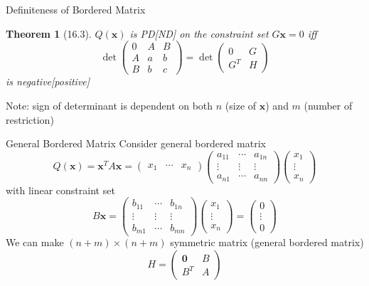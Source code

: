 \documentclass[final]{beamer}
\newtheorem{thm}{Theorem}
\newcommand{\bd}{\mathbf}
\begin{document}
\begin{frame}[t]{Definiteness of Bordered Matrix}
	\begin{thm}
		[16.3] $Q(\bd{x})$ is PD[ND] on the constraint set $G\bd{x}=0$ iff\[
			\det \begin{pmatrix}
							0&A&B\\
							A&a&b\\
							B&b&c
						\end{pmatrix}=\det \begin{pmatrix}
							0&G\\
							G^T&H
						\end{pmatrix}
		\] is negative[positive]
	\end{thm}
	Note: sign of determinant is dependent on both $n$ (size of $\bd{x}$) and $m$ (number of restriction)
\end{frame}

\begin{frame}[t]{General Bordered Matrix}
	Consider general bordered matrix \[
				Q(\bd{x})=\bd{x}^T A \bd{x} = \begin{pmatrix}
					x_1 &\cdots& x_n
				\end{pmatrix}\begin{pmatrix}
					a_{11} & \cdots & a_{1n}\\
					\vdots & \vdots & \vdots\\
					a_{n1} & \cdots & a_{nn}
				\end{pmatrix}\begin{pmatrix}
					x_1\\\vdots\\x_n
				\end{pmatrix}
			\] with linear constraint set\[
				B\bd{x}=\begin{pmatrix}
					b_{11}&\cdots&b_{1n}\\
					\vdots&\vdots&\vdots\\
					b_{m1}&\cdots&b_{mn}
				\end{pmatrix}\begin{pmatrix}
					x_1\\\vdots\\x_n
				\end{pmatrix}=\begin{pmatrix}
					0\\\vdots\\0
				\end{pmatrix}
			\]
			We can make $(n+m)\times(n+m)$ symmetric matrix (general bordered matrix) \[
				H = \begin{pmatrix}
					\bd{0}&B\\
					B^T&A
				\end{pmatrix}
			\]
\end{frame}
\end{document}
